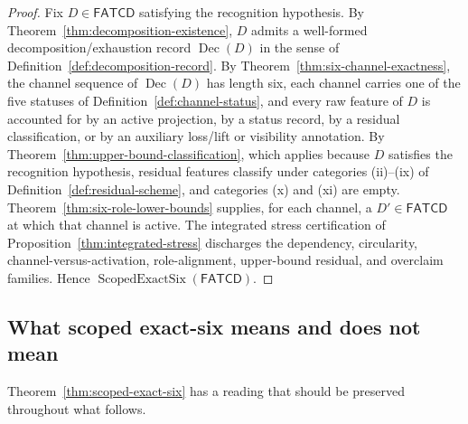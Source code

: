 \documentclass[11pt]{article}
\theoremstyle{definition}
\newcommand{\FATCD}{\ensuremath{\mathsf{FATCD}}}
\newcommand{\Dec}[1]{\ensuremath{\operatorname{Dec}\!\left(#1\right)}}
\newcommand{\ScopedExactSix}[1]{\ensuremath{\operatorname{ScopedExactSix}\!\left(#1\right)}}
\begin{document}
\begin{proof}
Fix \(D \in \FATCD{}\) satisfying the recognition hypothesis. By
Theorem~\ref{thm:decomposition-existence},
\(D\) admits a well-formed decomposition/exhaustion record \(\Dec{D}\)
in the sense of Definition~\ref{def:decomposition-record}. By
Theorem~\ref{thm:six-channel-exactness}, the channel sequence of
\(\Dec{D}\) has length six, each channel carries one of the five
statuses of Definition~\ref{def:channel-status}, and every raw
feature of \(D\) is accounted for by an active projection, by a
status record, by a residual classification, or by an auxiliary
loss/lift or visibility annotation. By
Theorem~\ref{thm:upper-bound-classification}, which applies because \(D\)
satisfies the recognition hypothesis, residual features classify under
categories (ii)--(ix) of Definition~\ref{def:residual-scheme}, and categories
(x) and (xi) are empty. Theorem~\ref{thm:six-role-lower-bounds} supplies, for each
channel, a \(D' \in \FATCD{}\) at which that channel is active. The
integrated stress certification of
Proposition~\ref{thm:integrated-stress} discharges the dependency,
circularity, channel-versus-activation, role-alignment, upper-bound
residual, and overclaim families. Hence \(\ScopedExactSix{\FATCD{}}\).
\end{proof}

\subsection{What scoped exact-six means and does not mean}\label{subsec:exact-six-meaning}

Theorem~\ref{thm:scoped-exact-six} has a reading that should be
preserved throughout what follows.
\end{document}
